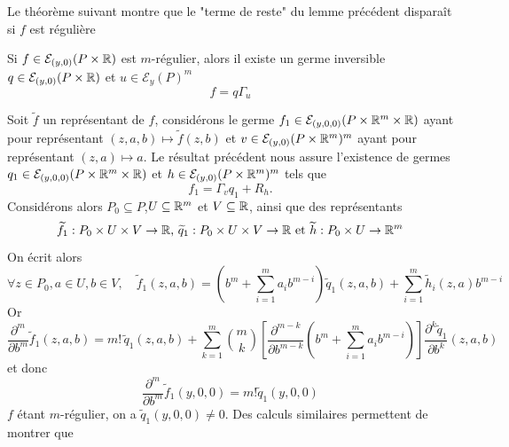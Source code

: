 \documentclass[memoire.tex]{subfiles}
\begin{document}
Le théorème suivant montre que le "terme de reste" du lemme précédent disparaît si $f$ est régulière

\begin{theorem}
    Si $f\in\mathcal{E}_{(y,0)}(P\times\mathbb{R})$ est $m$-régulier, alors il existe un germe  inversible 
    $q\in\mathcal{E}_{(y,0)}(P\times \mathbb{R})$ et $u\in\mathcal{E}_y(P)^{m}$
    \begin{equation*}
        f=q\Gamma_u
    \end{equation*}
\end{theorem}
\begin{preuve}
    Soit $\tilde{f}$ un représentant de $f$, considérons le germe $f_1\in\mathcal{E}_{(y,0,0)}(P\times\mathbb{R}^m\times \mathbb{R})$ ayant pour représentant $(z,a,b)\mapsto \tilde{f}(z,b) $ et $v\in\mathcal{E}_{(y,0)}(P\times\mathbb{R}^m)^m$ ayant pour représentant $(z,a)\mapsto a$.
    Le résultat précédent nous assure l'existence de 
    germes 
    $q_1\in\mathcal{E}_{(y,0,0)}(P\times\mathbb{R}^m\times\mathbb{R})$
    et $h\in\mathcal{E}_{(y,0)}(P\times\mathbb{R}^m)^m$ tels que
    \begin{equation*}
        f_1=\Gamma_v q_1 +R_h.
    \end{equation*}
    Considérons alors $P_0\subseteq P$,$U\subseteq \mathbb{R}^m$ et 
    $V\subseteq \mathbb{R}$, ainsi que des représentants
    \begin{equation*}
        \widetilde{f}_1: P_0\times U\times V \rightarrow \mathbb{R}\text{, }
        \widetilde{q}_1:P_0\times U\times V\rightarrow \mathbb{R}\text{ 
            et }\widetilde{h}:P_0\times U\rightarrow \mathbb{R}^m
    \end{equation*}
    On écrit alors
    \begin{equation*}
        \forall z\in P_0,a\in U,b\in V,\quad \tilde{f}_1(z,a,b)=(b^m+\sum_{i=1}^m a_ib^{m-i})\tilde{q}_1(z,a,b)+\sum_{i=1}^m\tilde{h}_i(z,a)b^{m-i}
    \end{equation*}
    Or 
    \begin{equation*}
        \frac{\partial^m }{\partial b^m}\widetilde{f}_1(z,a,b) = m! \, \widetilde{q}_1(z, a, b) + \sum_{k=1}^m \binom{m}{k} \left[ \frac{\partial^{m-k}}{\partial b^{m-k}} \left(b^m + \sum_{i=1}^m a_i b^{m-i}\right) \right] \frac{\partial^k \widetilde{q}_1}{\partial b^k}(z, a, b)
    \end{equation*}
    et donc 
    \begin{equation*}
        \frac{\partial^m }{\partial b^m}\widetilde{f}_1(y,0,0)=m! \widetilde{q}_1(y, 0, 0)
    \end{equation*}
    $f$ étant $m$-régulier, on a $\tilde{q}_1(y,0,0)\neq 0$. Des calculs similaires permettent de montrer que 

\end{preuve}
\end{document}
